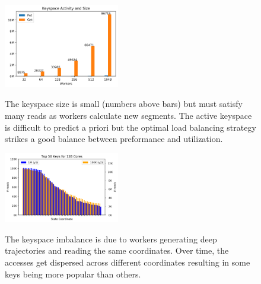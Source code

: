 \begin{figure}[tbh]
  \noindent\includegraphics[width=0.45\textwidth]{figures/methodology-keyspace.png}\\
  \caption{The keyspace size is small (numbers above bars) but must
  satisfy many reads as workers calculate new segments. The active keyspace is
  difficult to predict a priori but the optimal load balancing strategy strikes a
  good balance between preformance and utilization. 
  \label{fig:methodology-keyspace}}
\end{figure}

\begin{figure}[tbh]
  \noindent\includegraphics[width=0.45\textwidth]{figures/methodology-keys.png}\\
  \caption{The keyspace imbalance is due to workers generating deep
  trajectories and reading the same coordinates. Over time, the accesses get
  dispersed across different coordinates resulting in some keys being more
  popular than others.\label{fig:methodology-keys}}
\end{figure}

